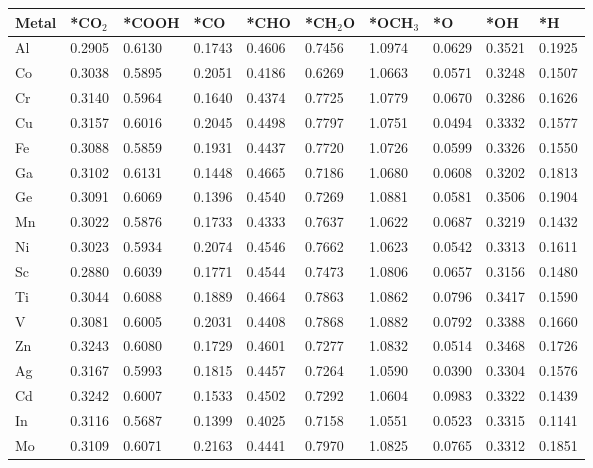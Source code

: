 \begin{table}[h]
  \centering
  {\fontsize{6}{12}\selectfont
  \begin{tabular}{*{10}{l}}
    \hline
    Metal & *CO$_2$ & *COOH & *CO & *CHO   & *CH$_2$O & *OCH$_3$ & *O & *OH    & *H     \\
    \hline
    Al & 0.2905 & 0.6130 & 0.1743 & 0.4606 & 0.7456 & 1.0974 & 0.0629 & 0.3521 & 0.1925 \\
    Co & 0.3038 & 0.5895 & 0.2051 & 0.4186 & 0.6269 & 1.0663 & 0.0571 & 0.3248 & 0.1507 \\
    Cr & 0.3140 & 0.5964 & 0.1640 & 0.4374 & 0.7725 & 1.0779 & 0.0670 & 0.3286 & 0.1626 \\
    Cu & 0.3157 & 0.6016 & 0.2045 & 0.4498 & 0.7797 & 1.0751 & 0.0494 & 0.3332 & 0.1577 \\
    Fe & 0.3088 & 0.5859 & 0.1931 & 0.4437 & 0.7720 & 1.0726 & 0.0599 & 0.3326 & 0.1550 \\
    Ga & 0.3102 & 0.6131 & 0.1448 & 0.4665 & 0.7186 & 1.0680 & 0.0608 & 0.3202 & 0.1813 \\
    Ge & 0.3091 & 0.6069 & 0.1396 & 0.4540 & 0.7269 & 1.0881 & 0.0581 & 0.3506 & 0.1904 \\
    Mn & 0.3022 & 0.5876 & 0.1733 & 0.4333 & 0.7637 & 1.0622 & 0.0687 & 0.3219 & 0.1432 \\
    Ni & 0.3023 & 0.5934 & 0.2074 & 0.4546 & 0.7662 & 1.0623 & 0.0542 & 0.3313 & 0.1611 \\
    Sc & 0.2880 & 0.6039 & 0.1771 & 0.4544 & 0.7473 & 1.0806 & 0.0657 & 0.3156 & 0.1480 \\
    Ti & 0.3044 & 0.6088 & 0.1889 & 0.4664 & 0.7863 & 1.0862 & 0.0796 & 0.3417 & 0.1590 \\
    V  & 0.3081 & 0.6005 & 0.2031 & 0.4408 & 0.7868 & 1.0882 & 0.0792 & 0.3388 & 0.1660 \\
    Zn & 0.3243 & 0.6080 & 0.1729 & 0.4601 & 0.7277 & 1.0832 & 0.0514 & 0.3468 & 0.1726 \\
    Ag & 0.3167 & 0.5993 & 0.1815 & 0.4457 & 0.7264 & 1.0590 & 0.0390 & 0.3304 & 0.1576 \\
    Cd & 0.3242 & 0.6007 & 0.1533 & 0.4502 & 0.7292 & 1.0604 & 0.0983 & 0.3322 & 0.1439 \\
    In & 0.3116 & 0.5687 & 0.1399 & 0.4025 & 0.7158 & 1.0551 & 0.0523 & 0.3315 & 0.1141 \\
    Mo & 0.3109 & 0.6071 & 0.2163 & 0.4441 & 0.7970 & 1.0825 & 0.0765 & 0.3312 & 0.1851 \\

\end{tabular}}
\end{table}
